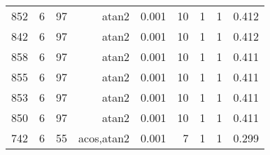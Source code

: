 \begin{table}
\begin{center}
\begin{tabular}{l|r|r|r|r|r|r|r|r}
852 & 6 & 97 & atan2 & 0.001 & 10 & 1 & 1 & 0.412 \\
842 & 6 & 97 & atan2 & 0.001 & 10 & 1 & 1 & 0.412 \\
858 & 6 & 97 & atan2 & 0.001 & 10 & 1 & 1 & 0.411 \\
855 & 6 & 97 & atan2 & 0.001 & 10 & 1 & 1 & 0.411 \\
853 & 6 & 97 & atan2 & 0.001 & 10 & 1 & 1 & 0.411 \\
850 & 6 & 97 & atan2 & 0.001 & 10 & 1 & 1 & 0.411 \\
742 & 6 & 55 & acos,atan2 & 0.001 & 7 & 1 & 1 & 0.299 \\

\end{tabular}
\end{center}
\end{table}
